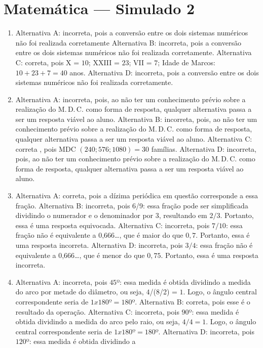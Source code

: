 \section*{Matemática — Simulado 2}

\begin{enumerate}
\item Alternativa A: incorreta, pois a conversão entre os dois sistemas
numéricos não foi realizada corretamente
Alternativa B: incorreta, pois a conversão entre os dois sistemas
numéricos não foi realizada corretamente.
Alternativa C: correta, pois X = $10$; XXIII = $23$; VII = $7$; Idade de Marcos: $10 + 23 + 7 = 40$ anos.
Alternativa D: incorreta, pois a conversão entre os dois sistemas
numéricos não foi realizada corretamente.
\item Alternativa A: incorreta, pois, ao não ter um conhecimento prévio sobre
a realização do M.\,D.\,C. como forma de resposta, qualquer alternativa
passa a ser um resposta viável ao aluno.
Alternativa B: incorreta, pois, ao não ter um conhecimento prévio sobre
a realização do M.\,D.\,C. como forma de resposta, qualquer alternativa
passa a ser um resposta viável ao aluno.
Alternativa C: correta , pois MDC $(240; 576; 1 080) = 30$ famílias.
Alternativa D: incorreta, pois, ao não ter um conhecimento prévio sobre
a realização do M.\,D.\,C. como forma de resposta, qualquer alternativa
passa a ser um resposta viável ao aluno.
\item Alternativa A: correta, pois a dízima periódica em questão corresponde a
essa fração.
Alternativa B: incorreta, pois $6$/9: essa fração pode ser simplificada
dividindo o numerador e o denominador por $3$, resultando em $2/3$.
Portanto, essa é uma resposta equivocada.
Alternativa C: incorreta, pois $7/10$: essa fração não é equivalente a
0,666\ldots, que é maior do que $0,7$. Portanto, essa é uma resposta
incorreta.
Alternativa D: incorreta, pois $3/4$: essa fração não é equivalente a
0,666\ldots, que é menor do que $0,75$. Portanto, essa é uma resposta
incorreta.
\item Alternativa A: incorreta, pois $45$º: essa medida é obtida dividindo a
medida do arco por metade do diâmetro, ou seja, $4$/(8/2) = $1$. Logo, o
ângulo central correspondente seria de $1 x 180º = 180$º.
Alternativa B: correta, pois esse é o resultado da operação.
Alternativa C: incorreta, pois $90$º: essa medida é obtida dividindo a
medida do arco pelo raio, ou seja, $4/4 = 1$. Logo, o ângulo central
correspondente seria de $1 x 180º = 180$º.
Alternativa D: incorreta, pois $120$º: essa medida é obtida dividindo a

\end{enumerate}
